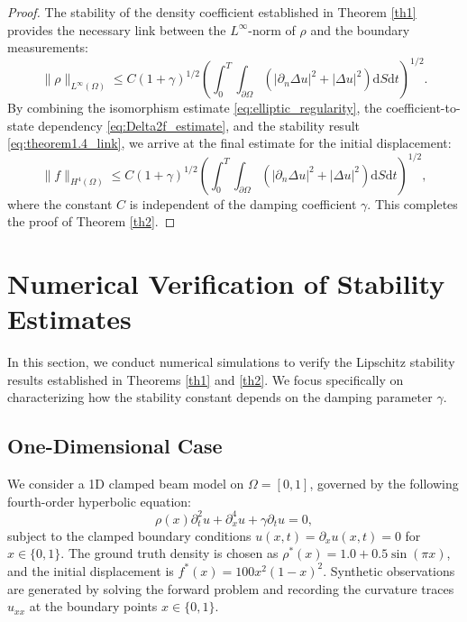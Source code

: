 \documentclass[12pt,reqno]{amsart}
\numberwithin{equation}{section}
\begin{document}
\begin{proof}
		The stability of the density coefficient established in Theorem \ref{th1} provides the necessary link between the $L^\infty$-norm of $\rho$ and the boundary measurements:
		\begin{equation}\label{eq:theorem1.4_link}
			\|\rho\|_{L^{\infty}(\Omega)} \le C (1+\gamma)^{1/2} \left( \int_{0}^{T} \int_{\partial\Omega} \left( |\partial_n \Delta u|^2 + |\Delta u|^2 \right) \mathrm{d}S \mathrm{d}t \right)^{1/2}.
		\end{equation}
		By combining the isomorphism estimate \eqref{eq:elliptic_regularity}, the coefficient-to-state dependency \eqref{eq:Delta2f_estimate}, and the stability result \eqref{eq:theorem1.4_link}, we arrive at the final estimate for the initial displacement:
		\[
		\|f\|_{H^{4}(\Omega)} \le C (1+\gamma)^{1/2} \left( \int_{0}^{T} \int_{\partial\Omega} \left( |\partial_n \Delta u|^2 + |\Delta u|^2 \right) \mathrm{d}S \mathrm{d}t \right)^{1/2},
		\]
		where the constant $C$ is independent of the damping coefficient $\gamma$. This completes the proof of Theorem \ref{th2}.
	\end{proof}
	
	\section{Numerical Verification of Stability Estimates}
	\label{sec5}
	In this section, we conduct numerical simulations to verify the Lipschitz stability results established in Theorems \ref{th1} and \ref{th2}. We focus specifically on characterizing how the stability constant depends on the damping parameter $\gamma$.
	
	\subsection{One-Dimensional Case}
	We consider a 1D clamped beam model on $\Omega = [0, 1]$, governed by the following fourth-order hyperbolic equation:
	\begin{equation}
		\rho(x) \partial_t^2 u + \partial_x^4 u + \gamma \partial_t u = 0,
	\end{equation}
	subject to the clamped boundary conditions $u(x, t) = \partial_x u(x, t) = 0$ for $x \in \{0, 1\}$. The ground truth density is chosen as $\rho^*(x) = 1.0 + 0.5 \sin(\pi x)$, and the initial displacement is $f^*(x) = 100 x^2(1-x)^2$. Synthetic observations are generated by solving the forward problem and recording the curvature traces $u_{xx}$ at the boundary points $x \in \{0, 1\}$.
	
\end{document}
